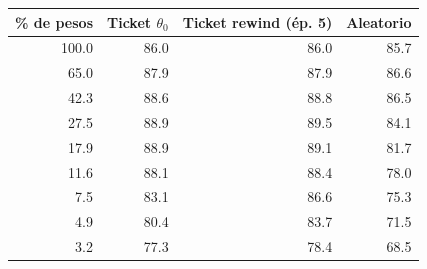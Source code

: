 \begin{tabular}{@{}rrrr@{}}\toprule
\% de pesos & Ticket $\theta_0$ & Ticket rewind (ép. 5) & Aleatorio \\\midrule
100.0 & 86.0 & 86.0 & 85.7 \\
65.0 & 87.9 & 87.9 & 86.6 \\
42.3 & 88.6 & 88.8 & 86.5 \\
27.5 & 88.9 & 89.5 & 84.1 \\
17.9 & 88.9 & 89.1 & 81.7 \\
11.6 & 88.1 & 88.4 & 78.0 \\
7.5 & 83.1 & 86.6 & 75.3 \\
4.9 & 80.4 & 83.7 & 71.5 \\
3.2 & 77.3 & 78.4 & 68.5 \\
\bottomrule\end{tabular}
